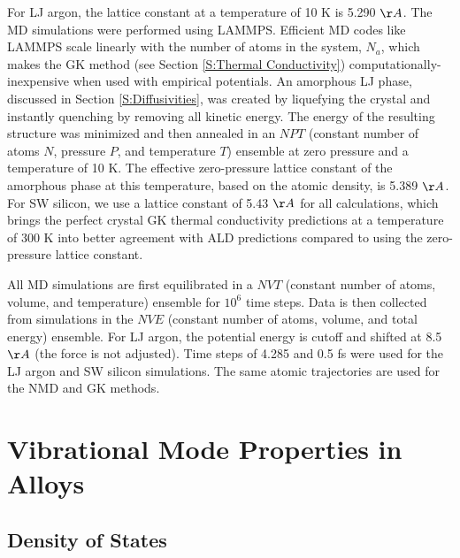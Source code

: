 For LJ argon, the lattice constant 
at a temperature of 10 K is 5.290 $\AA$.\cite{mcgaughey_phonon_2004} 
The MD simulations were performed using LAMMPS.\cite{plimpton_fast_1995} 
Efficient MD 
codes like LAMMPS scale linearly with the number of atoms in 
the system, $N_a$, which makes the GK method (see Section 
\ref{S:Thermal Conductivity}) 
computationally-inexpensive when used with empirical potentials. 
An amorphous LJ phase, discussed in Section \ref{S:Diffusivities}, 
was created by liquefying the crystal 
and instantly quenching by removing all kinetic energy.  The energy 
of the resulting structure was minimized and then annealed in an 
$NPT$ (constant number of atoms $N$, pressure $P$, and temperature $T$) 
ensemble at zero pressure and a temperature of 10 K.  
The effective zero-pressure lattice constant  
of the amorphous phase at this temperature, based on the atomic 
density, is 5.389 $\AA$.  
For SW silicon, we use a lattice constant of 5.43 $\AA$ 
for all calculations, which brings the perfect crystal GK 
thermal conductivity predictions at a temperature of 300 K
\cite{goicochea_thermal_2010,he_lattice_2012} 
into better agreement with ALD predictions\cite{sellan_cross-plane_2010} 
compared to using the zero-pressure lattice constant. 

All MD simulations are first equilibrated in a $NVT$ (constant 
number of atoms, volume, and temperature) ensemble for 
$10^6$ time steps. Data is then collected from simulations in the $NVE$ 
(constant number of 
atoms, volume, and total energy) ensemble. For LJ argon, the potential 
energy is cutoff and shifted at 8.5 $\AA$ (the force is not adjusted). 
Time steps of 4.285 and 0.5 fs were used for the LJ argon and 
SW silicon simulations. The same atomic trajectories are used for the 
NMD and GK methods. 

\section{\label{S:Vibrational}
Vibrational Mode Properties in Alloys}

\subsection{\label{S:VC Gamma DOS}Density of States}

